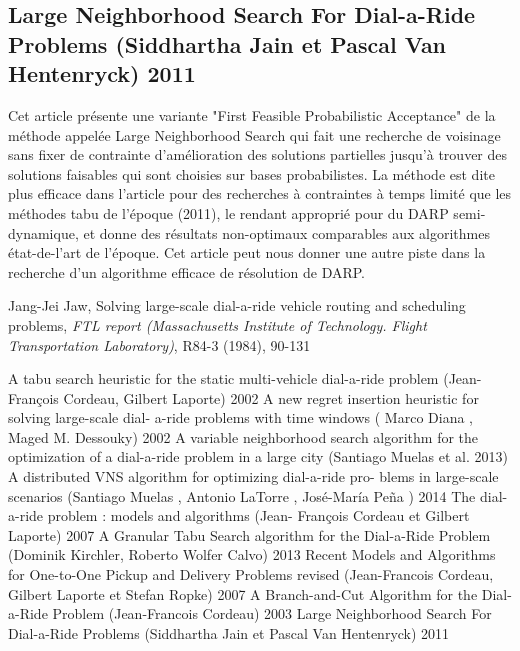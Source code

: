 \documentclass[10pt,a4paper]{report}
\begin{document}
\subsection*{Large Neighborhood Search For Dial-a-Ride Problems (Siddhartha Jain et Pascal Van Hentenryck) 2011}
Cet article présente une variante "First Feasible Probabilistic Acceptance" de la méthode appelée Large Neighborhood Search qui fait une recherche de voisinage sans fixer de contrainte d'amélioration des solutions partielles jusqu'à trouver des solutions faisables qui sont choisies sur bases probabilistes. La méthode est dite plus efficace dans l'article pour des recherches à contraintes à temps limité que les méthodes tabu de l'époque (2011), le rendant approprié pour du DARP semi-dynamique, et donne des résultats non-optimaux comparables aux algorithmes état-de-l'art de l'époque. 
Cet article peut nous donner une autre piste dans la recherche d'un algorithme efficace de résolution de DARP.
\begin{thebibliography}{10}
Jang-Jei Jaw, Solving large-scale dial-a-ride vehicle routing and scheduling problems,  \textit{FTL report (Massachusetts Institute of Technology. Flight Transportation Laboratory)}, R84-3 (1984), 90-131


\bibitem{} 
A tabu search heuristic for the static multi-vehicle
dial-a-ride problem (Jean-François Cordeau, Gilbert Laporte) 2002
\bibitem{}
A new regret insertion heuristic for solving large-scale dial-
a-ride problems with time windows ( Marco Diana , Maged
M. Dessouky) 2002
\bibitem{}
A variable neighborhood search algorithm for the optimization of a dial-a-ride problem in a large city (Santiago Muelas et al. 2013)
\bibitem{}
A distributed VNS algorithm for optimizing dial-a-ride pro-
blems in large-scale scenarios (Santiago Muelas , Antonio
LaTorre , José-María Peña ) 2014
\bibitem{}
The dial-a-ride problem : models and algorithms (Jean-
François Cordeau et Gilbert Laporte) 2007
\bibitem{}
A Granular Tabu Search algorithm for the Dial-a-Ride Problem (Dominik Kirchler, Roberto Wolfer Calvo) 2013
\bibitem{}
Recent Models and Algorithms for One-to-One Pickup and
Delivery Problems revised (Jean-Francois Cordeau, Gilbert
Laporte et Stefan Ropke) 2007
\bibitem{}
A Branch-and-Cut Algorithm for the Dial-a-Ride Problem
(Jean-Francois Cordeau) 2003
\bibitem{}
Large Neighborhood Search For Dial-a-Ride Problems (Siddhartha Jain et Pascal Van Hentenryck) 2011

\end{thebibliography}
\end{document}
